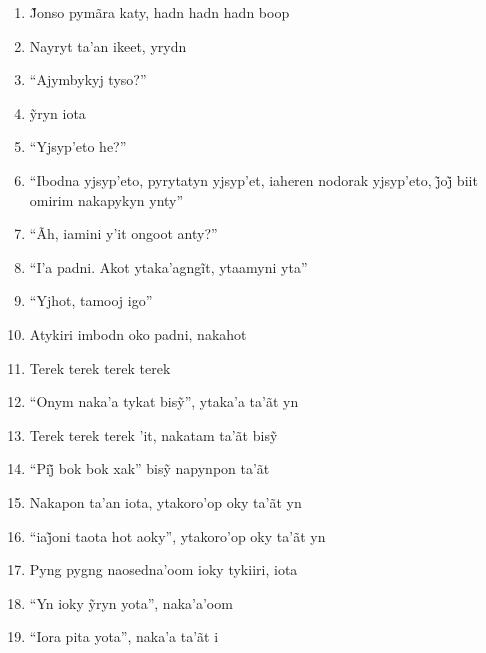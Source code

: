 \begin{enumerate}
 \item J̃onso pymãra katy, hadn hadn hadn boop

 \begin{center}\end{center}

 \item Nayryt ta'an ikeet, yrydn

 \item ``Ajymbykyj tyso?''

 \item ỹryn iota

 \item ``Yjsyp'eto he?''

 \item ``Ibodna yjsyp’eto, pyrytatyn yjsyp’et, iaheren nodorak yjsyp’eto, j̃oj̃ biit omirim nakapykyn ynty''

 \item ``Ãh, iamini y'it ongoot anty?''

 \item ``I’a padni. Akot ytaka’agngĩt, ytaamyni yta''

 \item ``Yjhot, tamooj igo''

 \item Atykiri imbodn oko padni, nakahot

 \begin{center}\end{center}

 \item Terek terek terek terek

 \item ``Onym naka’a tykat bisỹ'', ytaka’a ta’ãt yn

 \item Terek terek terek ’it, nakatam ta’ãt bisỹ

 \item ``Pij̃ bok bok xak'' bisỹ napynpon ta’ãt

 \item Nakapon ta'an iota, ytakoro'op oky ta'ãt yn

 \item ``iaj̃oni taota hot aoky'', ytakoro’op oky ta’ãt yn

 \item Pyng pygng naosedna'oom ioky tykiiri, iota

 \item ``Yn ioky ỹryn yota'', naka’a’oom

 \item ``Iora pita yota'', naka'a ta'ãt i


\end{enumerate}
